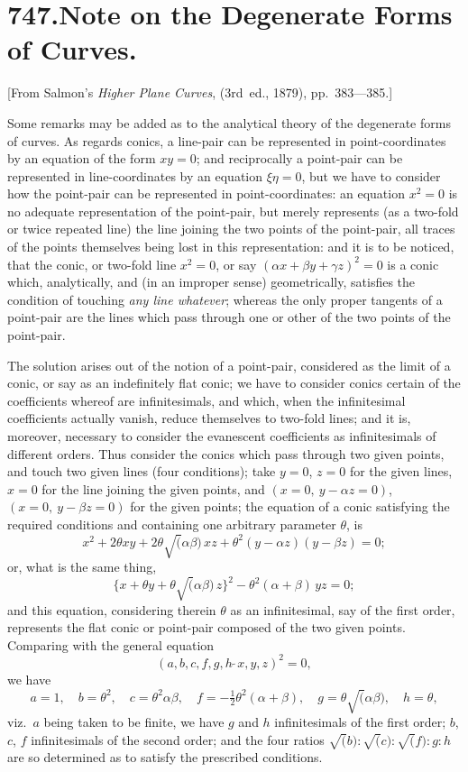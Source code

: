 \documentclass[12pt,a4paper]{article}
\begin{document}
\newpage
\section*{\textbf{747.}\quad Note on the Degenerate Forms of Curves.}

[From Salmon's \textit{Higher Plane Curves}, (3rd~ed., 1879), pp.~383---385.]

\medskip

Some remarks may be added as to the analytical theory of the degenerate forms of curves. As regards conics, a line-pair can be represented in point-coordinates by an equation of the form $xy = 0$; and reciprocally a point-pair can be represented in line-coordinates by an equation $\xi\eta = 0$, but we have to consider how the point-pair can be represented in point-coordinates: an equation $x^2 = 0$ is no adequate representation of the point-pair, but merely represents (as a two-fold or twice repeated line) the line joining the two points of the point-pair, all traces of the points themselves being lost in this representation: and it is to be noticed, that the conic, or two-fold line $x^2 = 0$, or say $(\alpha x + \beta y + \gamma z)^2 = 0$ is a conic which, analytically, and (in an improper sense) geometrically, satisfies the condition of touching \textit{any line whatever}; whereas the only proper tangents of a point-pair are the lines which pass through one or other of the two points of the point-pair.

The solution arises out of the notion of a point-pair, considered as the limit of a conic, or say as an indefinitely flat conic; we have to consider conics certain of the coefficients whereof are infinitesimals, and which, when the infinitesimal coefficients actually vanish, reduce themselves to two-fold lines; and it is, moreover, necessary to consider the evanescent coefficients as infinitesimals of different orders. Thus consider the conics which pass through two given points, and touch two given lines (four conditions); take $y = 0$, $z = 0$ for the given lines, $x = 0$ for the line joining the given points, and $(x = 0,\ y - \alpha z = 0)$, $(x = 0,\ y - \beta z = 0)$ for the given points; the equation of a conic satisfying the required conditions and containing one arbitrary parameter $\theta$, is
\[
x^2 + 2\theta xy + 2\theta\surd(\alpha\beta)\, xz + \theta^2(y - \alpha z)(y - \beta z) = 0;
\]
or, what is the same thing,
\[
\{x + \theta y + \theta\surd(\alpha\beta)\, z\}^2 - \theta^2(\alpha + \beta)\,yz = 0;
\]
and this equation, considering therein $\theta$ as an infinitesimal, say of the first order, represents the flat conic or point-pair composed of the two given points. Comparing with the general equation
\[
(a, b, c, f, g, h\,\!\!\!{\widetilde{\ }}x, y, z)^2 = 0,
\]
we have
\[
a = 1,\quad b = \theta^2,\quad c = \theta^2\alpha\beta,\quad f = -\tfrac{1}{2}\theta^2(\alpha+\beta),\quad g = \theta\surd(\alpha\beta),\quad h = \theta,
\]
viz.~$a$ being taken to be finite, we have $g$ and $h$ infinitesimals of the first order; $b$, $c$, $f$ infinitesimals of the second order; and the four ratios $\surd(b) : \surd(c) : \surd(f) : g : h$ are so determined as to satisfy the prescribed conditions.
\end{document}

